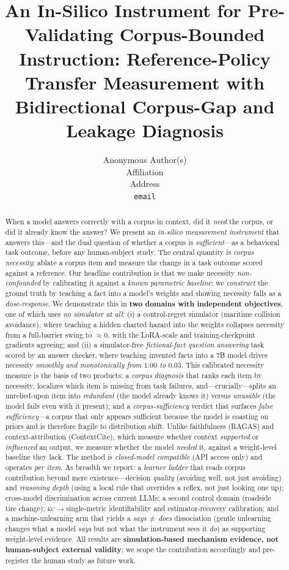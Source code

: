 \documentclass{article}
\title{An In-Silico Instrument for Pre-Validating Corpus-Bounded Instruction:
Reference-Policy Transfer Measurement with Bidirectional Corpus-Gap and Leakage Diagnosis}
\author{%
  Anonymous Author(s)\\
  Affiliation\\
  Address\\
  \texttt{email}
}
\newcommand{\kc}{\textsc{kc}}
\begin{document}
\maketitle

\begin{abstract}
When a model answers correctly with a corpus in context, did it \emph{need} the corpus, or
did it already know the answer? We present an \emph{in-silico measurement instrument} that
answers this---and the dual question of whether a corpus is \emph{sufficient}---as a
behavioral task outcome, before any human-subject study. The central quantity is
\emph{corpus necessity}: ablate a corpus item and measure the change in a task outcome scored
against a reference. Our headline contribution is that we make necessity \emph{non-confounded}
by calibrating it against a \emph{known parametric baseline}: we \emph{construct} the ground
truth by teaching a fact into a model's weights and showing necessity falls as a
\emph{dose-response}. We demonstrate this in \textbf{two domains with independent objectives},
one of which uses \emph{no simulator at all}: (i) a control-regret simulator (maritime
collision avoidance), where teaching a hidden charted hazard into the weights collapses
necessity from a full-barrier swing to $\approx 0$, with the LoRA-scale and training-checkpoint
gradients agreeing; and (ii) a simulator-free \emph{fictional-fact question answering} task
scored by an answer checker, where teaching invented facts into a 7B model drives necessity
\emph{smoothly and monotonically from $1.00$ to $0.03$}. This calibrated necessity measure is
the basis of two products: a \emph{corpus diagnosis} that ranks each item by necessity,
localizes which item is missing from task failures, and---crucially---splits an unrelied-upon
item into \emph{redundant} (the model already knows it) versus \emph{unusable} (the model
fails even with it present); and a \emph{corpus-sufficiency} verdict that surfaces
\emph{false sufficiency}---a corpus that only appears sufficient because the model is coasting
on priors and is therefore fragile to distribution shift. Unlike faithfulness (RAGAS) and
context-attribution (ContextCite), which measure whether context \emph{supported} or
\emph{influenced} an output, we measure whether the model \emph{needed} it, against a
weight-level baseline they lack. The method is \emph{closed-model compatible} (API access
only) and operates \emph{per item}. As breadth we report: a \emph{learner ladder} that reads corpus
contribution beyond mere existence---decision \emph{quality} (avoiding well, not just avoiding) and
\emph{reasoning depth} (using a local rule that overrides a reflex, not just looking one up);
cross-model discrimination across current LLMs; a second control domain (roadside tire change);
\kc$\to$single-metric identifiability and estimator-recovery calibration; and a machine-unlearning arm
that yields a \emph{says\,$\neq$\,does} dissociation (gentle unlearning changes what a model \emph{says}
but not what the instrument sees it \emph{do}) as supporting weight-level evidence. All results
are \textbf{simulation-based mechanism evidence, not human-subject external validity}; we
scope the contribution accordingly and pre-register the human study as future work.
\end{abstract}
\end{document}
